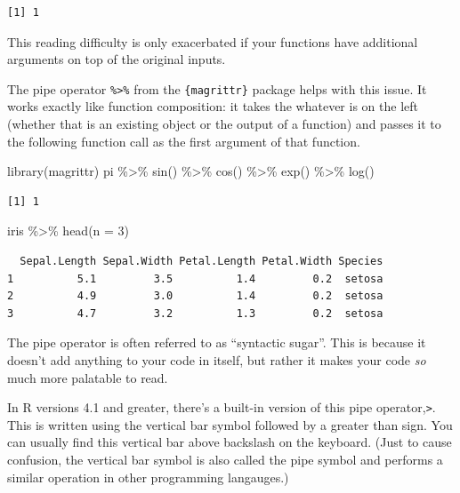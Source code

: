 \documentclass[
  letterpaper,
  DIV=11,
  numbers=noendperiod]{scrreprt}
\newenvironment{Shaded}{\begin{snugshade}}{\end{snugshade}}
\newcommand{\AttributeTok}[1]{\textcolor[rgb]{0.40,0.45,0.13}{#1}}
\newcommand{\DecValTok}[1]{\textcolor[rgb]{0.68,0.00,0.00}{#1}}
\newcommand{\FunctionTok}[1]{\textcolor[rgb]{0.28,0.35,0.67}{#1}}
\newcommand{\NormalTok}[1]{\textcolor[rgb]{0.00,0.23,0.31}{#1}}
\newcommand{\SpecialCharTok}[1]{\textcolor[rgb]{0.37,0.37,0.37}{#1}}
\begin{document}
\begin{verbatim}
[1] 1
\end{verbatim}

This reading difficulty is only exacerbated if your functions have
additional arguments on top of the original inputs.

The pipe operator \texttt{\%\textgreater{}\%} from the
\texttt{\{magrittr\}} package helps with this issue. It works exactly
like function composition: it takes the whatever is on the left (whether
that is an existing object or the output of a function) and passes it to
the following function call as the first argument of that function.

\begin{Shaded}
\begin{Highlighting}[]
\FunctionTok{library}\NormalTok{(magrittr)}
\NormalTok{pi }\SpecialCharTok{\%\textgreater{}\%} 
  \FunctionTok{sin}\NormalTok{() }\SpecialCharTok{\%\textgreater{}\%} 
  \FunctionTok{cos}\NormalTok{() }\SpecialCharTok{\%\textgreater{}\%} 
  \FunctionTok{exp}\NormalTok{() }\SpecialCharTok{\%\textgreater{}\%} 
  \FunctionTok{log}\NormalTok{()}
\end{Highlighting}
\end{Shaded}

\begin{verbatim}
[1] 1
\end{verbatim}

\begin{Shaded}
\begin{Highlighting}[]
\NormalTok{iris }\SpecialCharTok{\%\textgreater{}\%} 
  \FunctionTok{head}\NormalTok{(}\AttributeTok{n =} \DecValTok{3}\NormalTok{)}
\end{Highlighting}
\end{Shaded}

\begin{verbatim}
  Sepal.Length Sepal.Width Petal.Length Petal.Width Species
1          5.1         3.5          1.4         0.2  setosa
2          4.9         3.0          1.4         0.2  setosa
3          4.7         3.2          1.3         0.2  setosa
\end{verbatim}

The pipe operator is often referred to as ``syntactic sugar''. This is
because it doesn't add anything to your code in itself, but rather it
makes your code \emph{so} much more palatable to read.

In R versions 4.1 and greater, there's a built-in version of this pipe
operator,\texttt{\textbar{}\textgreater{}}. This is written using the
vertical bar symbol followed by a greater than sign. You can usually
find this vertical bar above backslash on the keyboard. (Just to cause
confusion, the vertical bar symbol is also called the pipe symbol and
performs a similar operation in other programming langauges.)
\end{document}
